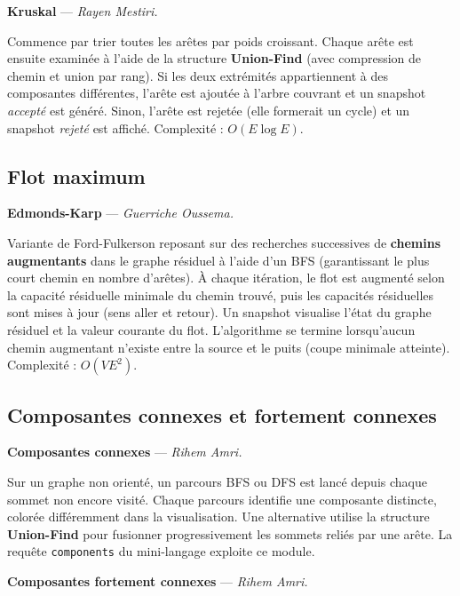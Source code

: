 \documentclass[a4paper,12pt]{report}
\begin{document}
\medskip
\textbf{Kruskal} — \textit{Rayen Mestiri.}

Commence par trier toutes les arêtes par poids croissant. Chaque arête est ensuite examinée
à l'aide de la structure \textbf{Union-Find} (avec compression de chemin et union par rang).
Si les deux extrémités appartiennent à des composantes différentes, l'arête est ajoutée à
l'arbre couvrant et un snapshot \textit{accepté} est généré. Sinon, l'arête est rejetée
(elle formerait un cycle) et un snapshot \textit{rejeté} est affiché. Complexité : $O(E \log E)$.


\subsection{Flot maximum}

\textbf{Edmonds-Karp} — \textit{Guerriche Oussema.}

Variante de Ford-Fulkerson reposant sur des recherches successives de \textbf{chemins augmentants}
dans le graphe résiduel à l'aide d'un BFS (garantissant le plus court chemin en nombre d'arêtes).
À chaque itération, le flot est augmenté selon la capacité résiduelle minimale du chemin trouvé,
puis les capacités résiduelles sont mises à jour (sens aller et retour). Un snapshot visualise
l'état du graphe résiduel et la valeur courante du flot. L'algorithme se termine lorsqu'aucun
chemin augmentant n'existe entre la source et le puits (coupe minimale atteinte).
Complexité : $O(VE^2)$.


\subsection{Composantes connexes et fortement connexes}

\textbf{Composantes connexes} — \textit{Rihem Amri.}

Sur un graphe non orienté, un parcours BFS ou DFS est lancé depuis chaque sommet non encore visité.
Chaque parcours identifie une composante distincte, colorée différemment dans la visualisation.
Une alternative utilise la structure \textbf{Union-Find} pour fusionner progressivement les sommets
reliés par une arête. La requête \texttt{components} du mini-langage exploite ce module.

\medskip
\textbf{Composantes fortement connexes} — \textit{Rihem Amri.}
\end{document}
